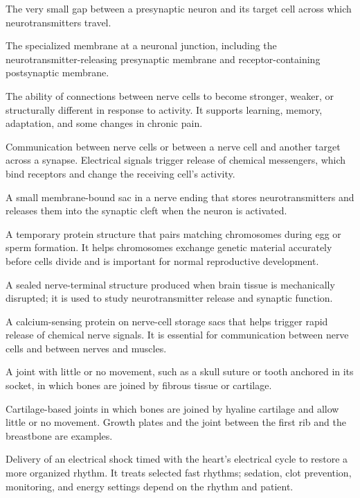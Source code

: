  The very small gap between a presynaptic neuron and its target cell across which neurotransmitters travel.

 The specialized membrane at a neuronal junction, including the neurotransmitter-releasing presynaptic membrane and receptor-containing postsynaptic membrane.

 The ability of connections between nerve cells to become stronger, weaker, or structurally different in response to activity. It supports learning, memory, adaptation, and some changes in chronic pain.

 Communication between nerve cells or between a nerve cell and another target across a synapse. Electrical signals trigger release of chemical messengers, which bind receptors and change the receiving cell’s activity.

 A small membrane-bound sac in a nerve ending that stores neurotransmitters and releases them into the synaptic cleft when the neuron is activated.

 A temporary protein structure that pairs matching chromosomes during egg or sperm formation. It helps chromosomes exchange genetic material accurately before cells divide and is important for normal reproductive development.

 A sealed nerve-terminal structure produced when brain tissue is mechanically disrupted; it is used to study neurotransmitter release and synaptic function.

 A calcium-sensing protein on nerve-cell storage sacs that helps trigger rapid release of chemical nerve signals. It is essential for communication between nerve cells and between nerves and muscles.

 A joint with little or no movement, such as a skull suture or tooth anchored in its socket, in which bones are joined by fibrous tissue or cartilage.

 Cartilage-based joints in which bones are joined by hyaline cartilage and allow little or no movement. Growth plates and the joint between the first rib and the breastbone are examples.

 Delivery of an electrical shock timed with the heart's electrical cycle to restore a more organized rhythm. It treats selected fast rhythms; sedation, clot prevention, monitoring, and energy settings depend on the rhythm and patient.


